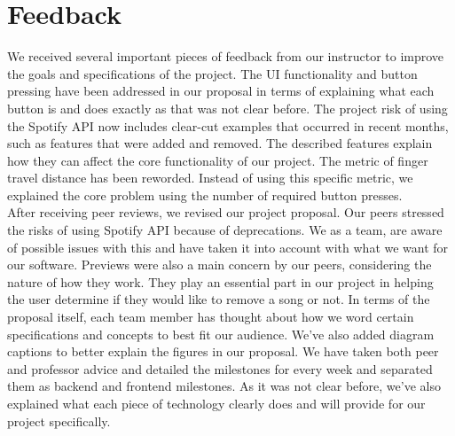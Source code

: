 \documentclass{article}
\begin{document}
\section{Feedback}
\quad We received several important pieces of feedback from our instructor to improve the goals and specifications of the project. The UI functionality and button pressing have been addressed in our proposal in terms of explaining what each button is and does exactly as that was not clear before. The project risk of using the Spotify API now includes clear-cut examples that occurred in recent months, such as features that were added and removed. The described features explain how they can affect the core functionality of our project. The metric of finger travel distance has been reworded. Instead of using this specific metric, we explained the core problem using the number of required button presses. \\

After receiving peer reviews, we revised our project proposal. Our peers stressed the risks of using Spotify API because of deprecations. We as a team, are aware of possible issues with this and have taken it into account with what we want for our software. Previews were also a main concern by our peers, considering the nature of how they work. They play an essential part in our project in helping the user determine if they would like to remove a song or not. In terms of the proposal itself, each team member has thought about how we word certain specifications and concepts to best fit our audience. We've also added diagram captions to better explain the figures in our proposal. We have taken both peer and professor advice and detailed the milestones for every week and separated them as backend and frontend milestones. As it was not clear before, we've also explained what each piece of technology clearly does and will provide for our project specifically.




\end{document}
